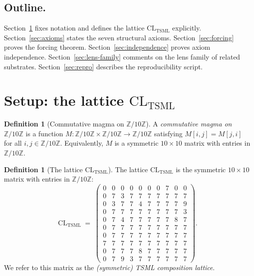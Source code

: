\documentclass[11pt,reqno]{amsart}
\theoremstyle{plain}
\theoremstyle{definition}
\newtheorem{definition}[theorem]{Definition}
\theoremstyle{remark}
\newcommand{\Z}{\mathbb{Z}}
\newcommand{\TSML}{\mathrm{TSML}}
\newcommand{\CL}{\mathrm{CL}}
\begin{document}
\subsection{Outline.}
Section~\ref{sec:setup} fixes notation and defines the lattice
$\CL_{\TSML}$ explicitly. Section~\ref{sec:axioms} states the seven
structural axioms. Section~\ref{sec:forcing} proves the forcing
theorem. Section~\ref{sec:independence} proves axiom independence.
Section~\ref{sec:lens-family} comments on the lens family of
related substrates. Section~\ref{sec:repro} describes the
reproducibility script.

\section{Setup: the lattice $\CL_{\TSML}$}
\label{sec:setup}

\begin{definition}[Commutative magma on $\Z/10\Z$]
\label{def:cm}
A \emph{commutative magma on $\Z/10\Z$} is a function
$M : \Z/10\Z \times \Z/10\Z \to \Z/10\Z$ satisfying $M[i, j] = M[j, i]$
for all $i, j \in \Z/10\Z$. Equivalently, $M$ is a symmetric
$10 \times 10$ matrix with entries in $\Z/10\Z$.
\end{definition}

\begin{definition}[The lattice $\CL_{\TSML}$]
\label{def:tsml}
The lattice $\CL_{\TSML}$ is the symmetric $10 \times 10$ matrix
with entries in $\Z/10\Z$:
\begin{equation}
\label{eq:tsml-table}
\CL_{\TSML} \;=\;
\begin{pmatrix}
0 & 0 & 0 & 0 & 0 & 0 & 0 & 7 & 0 & 0 \\
0 & 7 & 3 & 7 & 7 & 7 & 7 & 7 & 7 & 7 \\
0 & 3 & 7 & 7 & 4 & 7 & 7 & 7 & 7 & 9 \\
0 & 7 & 7 & 7 & 7 & 7 & 7 & 7 & 7 & 3 \\
0 & 7 & 4 & 7 & 7 & 7 & 7 & 7 & 8 & 7 \\
0 & 7 & 7 & 7 & 7 & 7 & 7 & 7 & 7 & 7 \\
0 & 7 & 7 & 7 & 7 & 7 & 7 & 7 & 7 & 7 \\
7 & 7 & 7 & 7 & 7 & 7 & 7 & 7 & 7 & 7 \\
0 & 7 & 7 & 7 & 8 & 7 & 7 & 7 & 7 & 7 \\
0 & 7 & 9 & 3 & 7 & 7 & 7 & 7 & 7 & 7
\end{pmatrix}.
\end{equation}
We refer to this matrix as the \emph{(symmetric) TSML composition
lattice}.
\end{definition}
\end{document}
